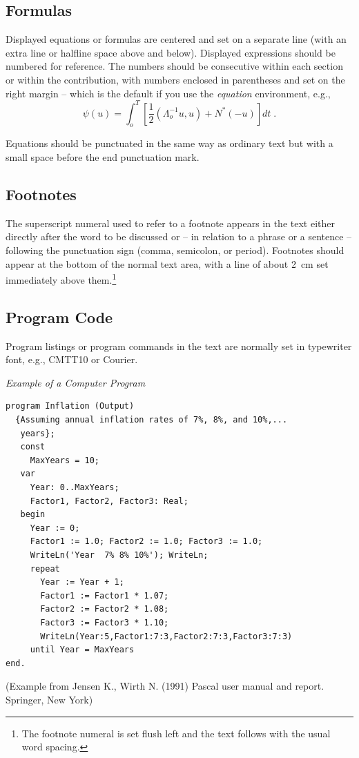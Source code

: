 \documentclass[runningheads,a4paper]{llncs}
\begin{document}
\subsection{Formulas}

Displayed equations or formulas are centered and set on a separate
line (with an extra line or halfline space above and below). Displayed
expressions should be numbered for reference. The numbers should be
consecutive within each section or within the contribution,
with numbers enclosed in parentheses and set on the right margin --
which is the default if you use the \emph{equation} environment, e.g.,
\begin{equation}
  \psi (u) = \int_{o}^{T} \left[\frac{1}{2}
  \left(\Lambda_{o}^{-1} u,u\right) + N^{\ast} (-u)\right] dt \;  .
\end{equation}

Equations should be punctuated in the same way as ordinary
text but with a small space before the end punctuation mark.

\subsection{Footnotes}

The superscript numeral used to refer to a footnote appears in the text
either directly after the word to be discussed or -- in relation to a
phrase or a sentence -- following the punctuation sign (comma,
semicolon, or period). Footnotes should appear at the bottom of
the
normal text area, with a line of about 2~cm set
immediately above them.\footnote{The footnote numeral is set flush left
and the text follows with the usual word spacing.}

\subsection{Program Code}

Program listings or program commands in the text are normally set in
typewriter font, e.g., CMTT10 or Courier.

\medskip

\noindent
{\it Example of a Computer Program\/}
\begin{verbatim}
program Inflation (Output)
  {Assuming annual inflation rates of 7%, 8%, and 10%,...
   years};
   const
     MaxYears = 10;
   var
     Year: 0..MaxYears;
     Factor1, Factor2, Factor3: Real;
   begin
     Year := 0;
     Factor1 := 1.0; Factor2 := 1.0; Factor3 := 1.0;
     WriteLn('Year  7% 8% 10%'); WriteLn;
     repeat
       Year := Year + 1;
       Factor1 := Factor1 * 1.07;
       Factor2 := Factor2 * 1.08;
       Factor3 := Factor3 * 1.10;
       WriteLn(Year:5,Factor1:7:3,Factor2:7:3,Factor3:7:3)
     until Year = MaxYears
end.
\end{verbatim}
%
\noindent
{\small (Example from Jensen K., Wirth N. (1991) Pascal user manual and
report. Springer, New York)}
\end{document}
